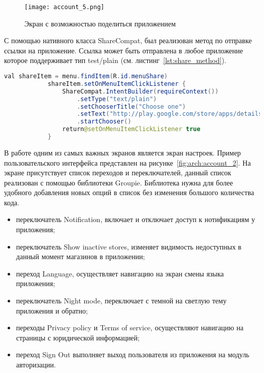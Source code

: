 \begin{figure}[H]
 \centering
   \texttt{[image: account\_5.png]} 
   \caption{Экран с возможностью поделиться приложением}
   \label{fig:arch:account_5}
\end{figure}

С помощью нативного класса ShareCompat, был реализован метод по отправке ссылки на приложение. Ссылка может быть отправлена в любое приложение которое поддерживает тип test/plain (см. листинг~\ref{lst:share_method}).
\begin{lstlisting}[language=Java,label={lst:share_method},caption={Методы для отправки ссылки на приложение}]
            val shareItem = menu.findItem(R.id.menuShare)
            shareItem.setOnMenuItemClickListener {
                ShareCompat.IntentBuilder(requireContext())
                    .setType("text/plain")
                    .setChooserTitle("Choose one")
                    .setText("http://play.google.com/store/apps/details?id=" + requireActivity().packageName)
                    .startChooser()
                return@setOnMenuItemClickListener true
            }
\end{lstlisting}

В работе одним из самых важных экранов является экран настроек. Пример пользовательского интерфейса представлен на рисунке~\ref{fig:arch:account_2}. На экране присутствует список переходов и переключателей, данный список реализован с помощью библиотеки Groupie. Библиотека нужна для более удобного добавления новых опций в список без изменения большого количества кода.

\begin{itemize}
    \item переключатель Notification, включает и отключает доступ к нотификациям у приложения;
    \item переключатель Show inactive stores, изменяет видимость недоступных в данный момент магазинов в приложении;
    \item переход Language, осуществляет навигацию на экран смены языка приложения;
    \item переключатель Night mode, переключает с темной на светлую тему приложения и обратно;
    \item переходы Privacy policy и Terms of service, осуществляют навигацию на страницы с юридической информацией;
    \item переход Sign Out выполняет выход пользователя из приложения на модуль авторизации.
\end{itemize}

